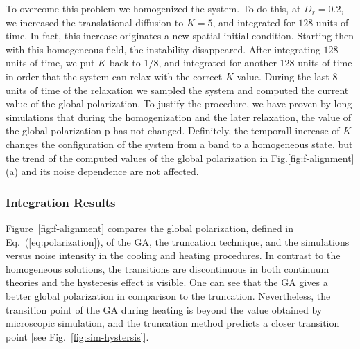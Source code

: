 \documentclass[reprint,floatfix,amsmath,amssymb,aps,pre,showkeys,showpacs,superscriptaddress]{revtex4-1}
\newcommand{\hl}[1]{\textcolor{hlcolor}{#1}}
\newcommand{\req}[1]{Eq.~(\ref{#1})}
\begin{document}
\hl{
To overcome this problem we homogenized the system. To do this, at $D_r=0.2$, we increased the translational diffusion to $K=5$, and integrated for $128$ units of time. In fact, this increase originates a new spatial initial condition. Starting then with this homogeneous field, the instability
disappeared. After integrating $128$ units of time, we put $K$ back to $1/8$, and integrated for another $128$ units of time in order that the system can relax with the correct $K$-value. During the last $8$ units of time of the relaxation we sampled the system and  computed the current value of the global polarization. To justify the procedure, we have proven by long simulations that during the homogenization and the later relaxation, the value of the global polarization p has not changed. Definitely, the temporall increase of $K$ changes the configuration of the system from a band to a homogeneous state, but the trend of  the computed values of the global polarization in Fig.\ref{fig:f-alignment}(a) and its noise dependence are not affected.
}

\subsubsection{Integration Results}

Figure~\ref{fig:f-alignment} compares the global polarization, defined in \req{eq:polarization}, of the GA, the truncation technique, and the simulations versus noise intensity in the cooling and heating procedures. In contrast to the homogeneous solutions, the transitions are discontinuous in both continuum theories and the hysteresis effect is visible. One can see that the GA gives a better global polarization in comparison to the truncation. Nevertheless, the transition point of the GA during heating is beyond the value obtained by microscopic simulation, and the truncation method predicts a closer transition point [see Fig.~\ref{fig:sim-hystersis}].
\end{document}
